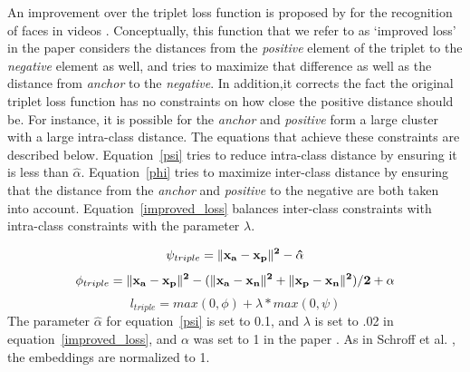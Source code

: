 An improvement over the triplet loss function is proposed by \cite{DBLP:conf/cvpr/SchroffKP15} for the recognition of faces in videos \cite{Zhang:2016:DML:3088616.3088665}.  Conceptually, this function that we refer to as `improved loss' in the paper considers the distances from the \textit{positive} element of the triplet to the \textit{negative} element as well, and tries to maximize that difference as well as the distance from \textit{anchor} to the \textit{negative}.  In addition,it corrects the fact the  original triplet loss function has no constraints on how close the positive distance should be.  For instance, it is possible for the \textit{anchor} and \textit{positive} form a large cluster with a large intra-class distance. The equations that achieve these constraints are described below.  Equation~\ref{psi} tries to reduce intra-class distance by ensuring it is less than $\hat{\alpha}$.  Equation~\ref{phi} tries to maximize inter-class distance by ensuring that the distance from the \textit{anchor} and \textit{positive} to the negative are both taken into account.  Equation~\ref{improved_loss} balances inter-class constraints with intra-class constraints with the parameter $\lambda$. 

\begin{equation}
  \psi_{triple} = \|\bf{x_{a}} - \bf{x_{p}}\|^2 - \hat{\alpha}
\label{psi}
\end{equation}
\begin{equation}
  \phi_{triple} = \|\bf{x_{a}} - \bf{x_{p}}\|^2 - (\|\bf{x_{a}}- \bf{x_{n}}\|^2 + \|\bf{x_{p}} - \bf{x_{n}}\|^2) / 2  + \alpha
\label{phi}
\end{equation}
\begin{equation}
  l_{triple} = max(0, \phi) + \lambda * max(0, \psi)
\label{improved_loss}
\end{equation}
The parameter $\hat{\alpha}$ for equation~\ref{psi} is set to 0.1, and $\lambda$ is set to .02 in equation~\ref{improved_loss}, and $\alpha$ was set to 1 in the paper \cite{Zhang:2016:DML:3088616.3088665}.  As in Schroff et al. \cite{DBLP:conf/cvpr/SchroffKP15}, the embeddings are normalized to 1.

